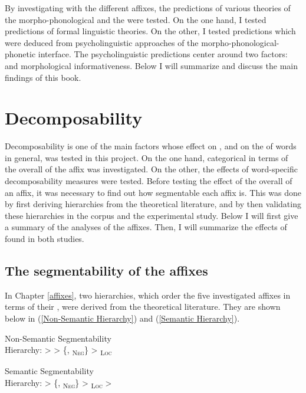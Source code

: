 By investigating  with the different affixes, the predictions of various theories of the morpho-phonological and the  were tested. On the one hand, I tested predictions of formal linguistic theories. On the other, I tested predictions which were deduced from psycholinguistic approaches of the morpho-phonological-phonetic interface. The psycholinguistic predictions center around two factors:  and morphological informativeness.  Below I will summarize and discuss the main findings of this book.



\section{Decomposability}

Decomposability is one of the main factors whose effect on , and on the  of words in general, was tested in this project. On the one hand, categorical  in terms of the overall  of the affix was investigated. On the other, the effects of word-specific decomposability measures were tested. 
Before testing the effect of the overall  of an affix, it was necessary to find out how segmentable each affix is. This was done by first deriving  hierarchies from the theoretical literature, and by then validating these hierarchies  in the corpus and the experimental study. Below I will first give a summary of the  analyses of the affixes. Then, I will summarize the effects of  found in both studies.



\subsection{The segmentability of the affixes}

In Chapter \ref{affixes}, two  hierarchies, which order the five investigated affixes in terms of their , were derived from the theoretical literature. They are shown below in (\ref{Non-Semantic Hierarchy})  and (\ref{Semantic Hierarchy}). 


	\begin{exe}
		\ex \label{Non-Semantic Hierarchy} {Non-Semantic Segmentability }\\
		Hierarchy:   >  > \{, \textsubscript{\textsc{Neg}}\} >  \textsubscript{\textsc{Loc}}
		
				\ex \label{Semantic Hierarchy} 	{Semantic Segmentability }\\
				Hierarchy:   > \{, \textsubscript{\textsc{Neg}}\} >  \textsubscript{\textsc{Loc}} > 
	\end{exe}

